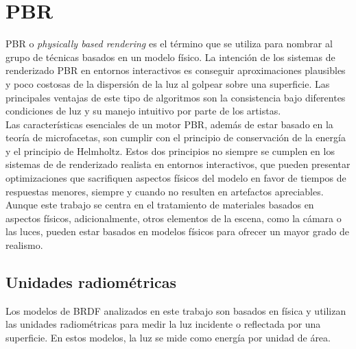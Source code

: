 \chapter{PBR}
PBR o \textit{physically based rendering} es el t\'ermino que se utiliza para nombrar al grupo de t\'ecnicas basados en un
modelo f\'isico. La intenci\'on de los sistemas de renderizado PBR en entornos interactivos es conseguir aproximaciones plausibles
y poco costosas de la dispersi\'on de la luz al golpear sobre una superficie. Las principales ventajas de este tipo de algoritmos
son la consistencia bajo diferentes condiciones de luz y su manejo intuitivo por parte de los artistas.\\

Las caracter\'isticas esenciales de un motor PBR, adem\'as de estar basado en la teor\'ia de microfacetas, son cumplir con el principio
de conservaci\'on de la energ\'ia y el principio de Helmholtz. Estos dos principios no siempre se cumplen en los sistemas de
de renderizado realista en entornos interactivos, que pueden presentar optimizaciones que sacrifiquen aspectos f\'isicos del modelo
en favor de tiempos de respuestas menores, siempre y cuando no resulten en artefactos apreciables.\\

Aunque este trabajo se centra en el tratamiento de materiales basados en aspectos f\'isicos, adicionalmente, otros elementos
de la escena, como la c\'amara o las luces, pueden estar basados en modelos f\'isicos para ofrecer un mayor grado de realismo.

\section{Unidades radiom\'etricas}
    Los modelos de BRDF analizados en este trabajo son basados en f\'isica y utilizan las unidades radiom\'etricas para
    medir la luz incidente o reflectada por una superficie. En estos modelos, la luz se mide como energ\'ia por unidad de
    \'area.

